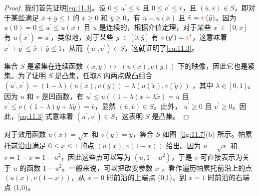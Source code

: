 \begin{proof}
我们首先证明\eqref{eq:11.3}。设 \(0 \leq  {u}^{\prime } \leq  \bar{u}\) 且 \(0 \leq  {v}^{\prime } \leq  \bar{v}\)，且 \(\left( {\bar{u},\bar{v}}\right)  \in  S\)，即对于某些满足 \(\bar{x} + \bar{y} \leq  1\) 的 \(\bar{x} \geq  0\) 和 \(\bar{y} \geq  0\)，有 \(\bar{u} = u\left(\bar{x}\right)\) 且 \(\bar{v} = \textcolor{red}{v}\left(\bar{y}\right)\)。因为 \(u\left( 0\right)  = 0 \leq  {u}^{\prime } \leq  u\left( \bar{x}\right)\) 且 \(u\) 是连续的，根据介值定理，对于某些 \({x}^{\prime } \in  \left\lbrack  {0,\bar{x}}\right\rbrack\) 有 \(u\left( {x}^{\prime }\right)  = {u}^{\prime }\)，类似地，对于某些 \({y}^{\prime } \in  \left\lbrack  {0,\bar{y}}\right\rbrack\) 有 \(v\left( {y}^{\prime }\right)  = \textcolor{red}{v}^{\prime }\)，这意味着 \({x}^{\prime } + {y}^{\prime } \leq  \bar{x} + \bar{y} \leq  1\)，从而 \(\left( {{u}^{\prime },{v}^{\prime }}\right)  \in  S\)，这就证明了\eqref{eq:11.3}。

集合 \(S\) 是紧集在连续函数 \(\left( {x,y}\right)  \mapsto\)  \(\left( {u\left( x\right) ,v\left( y\right) }\right)\) 下的映像，因此它也是紧集。为了证明 \(S\) 是凸集，任取\(S\) 内两点做凸组合 \(\left( {{u}^{\prime },{v}^{\prime }}\right)  = \left( {1 - \lambda }\right) \left( {u\left( x\right),v\left( y\right) }\right)  + \lambda \left( {u\left( \widetilde{x}\right),v\left( \widetilde{y}\right) }\right)\) ，其中 \(\lambda  \in  \left\lbrack  {0,1}\right\rbrack\)。因为 \(u\) 和 \(v\) 是凹函数，有 \({u}^{\prime } \leq  u\left( {\left( {1 - \lambda }\right) x + \lambda \widetilde{x}}\right)  = \bar{u}\) 且 \({v}^{\prime } \leq  v\left( {\left( {1 - \lambda }\right) y + \lambda \widetilde{y}}\right)  = \bar{v}\)，显然 \(\left( {\bar{u},\bar{v}}\right)  \in  S\)。此外， \({u}^{\prime } \geq  0\) 且 \({v}^{\prime } \geq  0\)。因此，\eqref{eq:11.3} 式意味着 \(\left( {{u}^{\prime },{v}^{\prime }}\right)  \in  S\)，这表明 \(S\) 是凸集。
\end{proof}

对于效用函数 \(u\left( x\right)  = \sqrt{x}\) 和 \(v\left( y\right)  = y\)，集合 \(S\) 如图~\ref{fig:11.7}(b) 所示。帕累托前沿由满足 \(0 \leq  x \leq  1\) 的点 \(\left( {u\left( x\right),v\left( {1 - x}\right) }\right)\) 给出。因为 \(u = \sqrt{x}\) 和 \(v = 1 - x = 1 - {u}^{2}\)，因此这些点可以写为 \(\left( {u,1 - {u}^{2}}\right)\)，于是 \(v\) 可直接表示为关于 \(u\) 的函数 \(1 - {u}^{2}\)。一般来说，可以把改变参数 \(x\) ，看作遍历帕累托前沿上的点 \(\left( {u\left( x\right),v\left( {1 - x}\right) }\right)\)，从 \(x = 0\) 时前沿的上端点 (0,1)，到 \(x = 1\) 时前沿的右端点 (1,0)。


